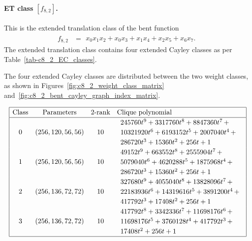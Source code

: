 \documentclass[12pt,a4paper]{article}
\begin{document}
%
\paragraph*{ET class $[f_{8,2}]$.}
%
This is the extended translation class of the bent function
\small{}
\begin{align*}
f_{ 8 , 2 } &=
\begin{array}{l}
x_{0} x_{1} x_{2} + x_{0} x_{3} + x_{1} x_{4} + x_{2} x_{5} + x_{6} x_{7}.
\end{array}
\end{align*}
\normalsize{}
The extended translation class contains four extended Cayley classes as per Table~\ref{tab-c8_2_EC_classes}.

The four extended Cayley classes are distributed between the two weight classes,
as shown in Figures~\ref{fig:c8_2_weight_class_matrix} and~\ref{fig:c8_2_bent_cayley_graph_index_matrix}.

\begin{table}[!bhpt] %
\small{}
\begin{align*}
\def\arraystretch{1.2}
\begin{array}{|cccl|}
\hline
\text{Class} &
\text{Parameters} &
\text{2-rank} &
\text{Clique polynomial}
\\
\hline
0 &
(256, 120, 56, 56) &
10 &
\begin{array}{l}
245760t^{9} + 3317760t^{8} + 8847360t^{7}
\,+
\\
 10321920t^{6} + 6193152t^{5} + 2007040t^{4}
\,+
\\
 286720t^{3} + 15360t^{2} + 256t + 1
\end{array}
\\
1 &
(256, 120, 56, 56) &
10 &
\begin{array}{l}
49152t^{9} + 663552t^{8} + 2555904t^{7}
\,+
\\
 5079040t^{6} + 4620288t^{5} + 1875968t^{4}
\,+
\\
 286720t^{3} + 15360t^{2} + 256t + 1
\end{array}
\\
2 &
(256, 136, 72, 72) &
10 &
\begin{array}{l}
327680t^{9} + 4055040t^{8} + 13828096t^{7}
\,+
\\
 22183936t^{6} + 14319616t^{5} + 3891200t^{4}
\,+
\\
 417792t^{3} + 17408t^{2} + 256t + 1
\end{array}
\\
3 &
(256, 136, 72, 72) &
10 &
\begin{array}{l}
417792t^{8} + 3342336t^{7} + 11698176t^{6}
\,+
\\
 11698176t^{5} + 3760128t^{4} + 417792t^{3}
\,+
\\
 17408t^{2} + 256t + 1
\end{array}
\\
\hline
\end{array}
\end{align*}
\caption{$[f_{8,2}]$ extended Cayley classes.}
\label{tab-c8_2_EC_classes}
\end{table}
\end{document}
